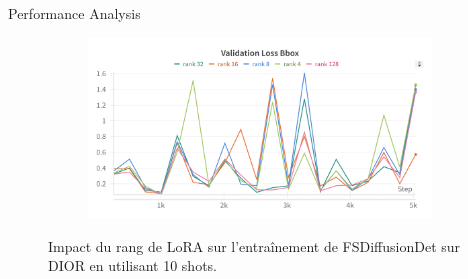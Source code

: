 \begin{subsectionframemod}{Performance Analysis}
\begin{figure}[h]
\begin{subfigure}{0.45\textwidth}
        \end{subfigure}
        \begin{subfigure}{0.45\textwidth}
            \includegraphics[width=\textwidth]{Figures/lora_rank4.png}
        \end{subfigure}
        \caption{Impact du rang de LoRA sur l'entraînement de FSDiffusionDet sur DIOR en utilisant 10 shots.}
        \label{fig:lora_curves2}
    \end{figure}
\end{subsectionframemod}